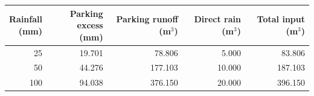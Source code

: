 \begin{tabular}{rrrrr}
\toprule
\shortstack{Rainfall\\(mm)} & \shortstack{Parking excess\\(mm)} & \shortstack{Parking runoff\\(m$^3$)} & \shortstack{Direct rain\\(m$^3$)} & \shortstack{Total input\\(m$^3$)} \\
\midrule
25 & 19.701 & 78.806 & 5.000 & 83.806 \\
50 & 44.276 & 177.103 & 10.000 & 187.103 \\
100 & 94.038 & 376.150 & 20.000 & 396.150 \\
\bottomrule
\end{tabular}
